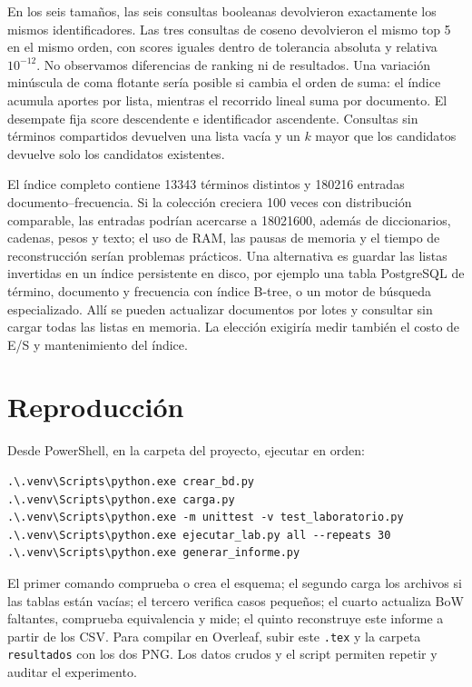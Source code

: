 \documentclass[11pt,a4paper]{article}
\newcommand{\codigo}[1]{\texttt{#1}}
\begin{document}
En los seis tamaños, las seis consultas booleanas devolvieron exactamente los mismos
identificadores. Las tres consultas de coseno devolvieron el mismo top 5 en el mismo
orden, con scores iguales dentro de tolerancia absoluta y relativa $10^{-12}$.
No observamos diferencias de ranking ni de resultados. Una variación minúscula de
coma flotante sería posible si cambia el orden de suma: el índice acumula aportes por
lista, mientras el recorrido lineal suma por documento. El desempate fija score
descendente e identificador ascendente. Consultas sin términos compartidos devuelven
una lista vacía y un $k$ mayor que los candidatos devuelve solo los candidatos existentes.

El índice completo contiene 13343 términos distintos y
180216 entradas documento--frecuencia. Si la colección creciera
100 veces con distribución comparable, las entradas podrían acercarse a
18021600, además de diccionarios, cadenas, pesos y texto;
el uso de RAM, las pausas de memoria y el tiempo de reconstrucción serían problemas
prácticos. Una alternativa es guardar las listas invertidas en un índice persistente
en disco, por ejemplo una tabla PostgreSQL de término, documento y frecuencia con
índice B-tree, o un motor de búsqueda especializado. Allí se pueden actualizar
documentos por lotes y consultar sin cargar todas las listas en memoria. La elección
exigiría medir también el costo de E/S y mantenimiento del índice.


\section{Reproducción}
Desde PowerShell, en la carpeta del proyecto, ejecutar en orden:
\begin{verbatim}
.\.venv\Scripts\python.exe crear_bd.py
.\.venv\Scripts\python.exe carga.py
.\.venv\Scripts\python.exe -m unittest -v test_laboratorio.py
.\.venv\Scripts\python.exe ejecutar_lab.py all --repeats 30
.\.venv\Scripts\python.exe generar_informe.py
\end{verbatim}
El primer comando comprueba o crea el esquema; el segundo carga los archivos
si las tablas están vacías; el tercero verifica casos pequeños; el cuarto
actualiza BoW faltantes, comprueba equivalencia y mide; el quinto reconstruye
este informe a partir de los CSV. Para compilar en Overleaf, subir este \codigo{.tex}
y la carpeta \codigo{resultados} con los dos PNG. Los datos crudos y el
script permiten repetir y auditar el experimento.
\end{document}

